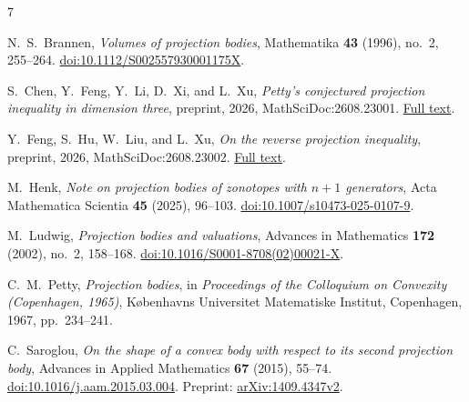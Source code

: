 \begin{thebibliography}{7}

N.~S.~Brannen,
\emph{Volumes of projection bodies},
Mathematika \textbf{43} (1996), no.~2, 255--264.
\href{https://doi.org/10.1112/S002557930001175X}{doi:10.1112/S002557930001175X}.

S.~Chen, Y.~Feng, Y.~Li, D.~Xi, and L.~Xu,
\emph{Petty's conjectured projection inequality in dimension three},
preprint, 2026, MathSciDoc:2608.23001.
\href{https://archive.ymsc.tsinghua.edu.cn/pacm_download/741/12780-pettyinequality.pdf}{Full text}.

Y.~Feng, S.~Hu, W.~Liu, and L.~Xu,
\emph{On the reverse projection inequality},
preprint, 2026, MathSciDoc:2608.23002.
\href{https://archive.ymsc.tsinghua.edu.cn/pacm_download/743/12781--2026.8.26.pdf}{Full text}.

M.~Henk,
\emph{Note on projection bodies of zonotopes with \(n+1\) generators},
Acta Mathematica Scientia \textbf{45} (2025), 96--103.
\href{https://doi.org/10.1007/s10473-025-0107-9}{doi:10.1007/s10473-025-0107-9}.

M.~Ludwig,
\emph{Projection bodies and valuations},
Advances in Mathematics \textbf{172} (2002), no.~2, 158--168.
\href{https://doi.org/10.1016/S0001-8708(02)00021-X}{doi:10.1016/S0001-8708(02)00021-X}.

C.~M.~Petty,
\emph{Projection bodies},
in \emph{Proceedings of the Colloquium on Convexity (Copenhagen, 1965)},
K\o benhavns Universitet Matematiske Institut, Copenhagen, 1967,
pp.~234--241.

C.~Saroglou,
\emph{On the shape of a convex body with respect to its second projection body},
Advances in Applied Mathematics \textbf{67} (2015), 55--74.
\href{https://doi.org/10.1016/j.aam.2015.03.004}{doi:10.1016/j.aam.2015.03.004}.
Preprint:
\href{https://arxiv.org/abs/1409.4347v2}{arXiv:1409.4347v2}.

\end{thebibliography}
